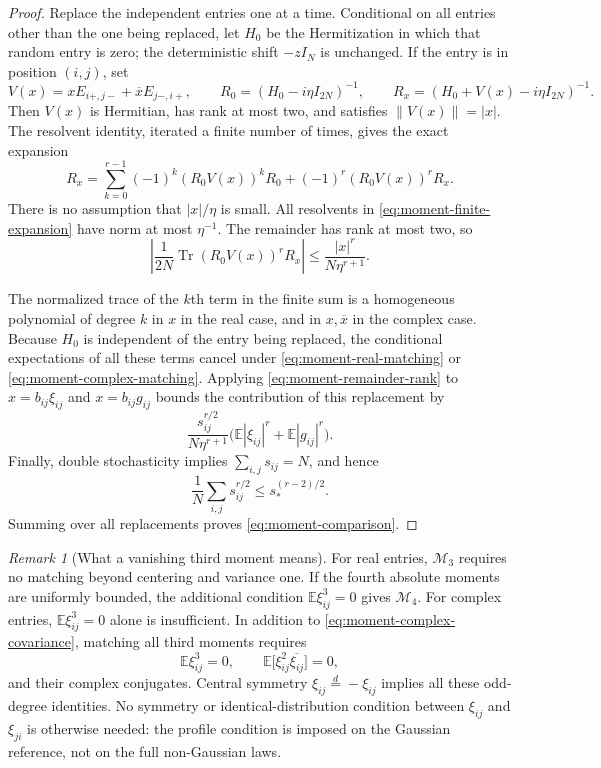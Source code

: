 \documentclass[11pt,reqno]{amsart}
\numberwithin{equation}{section}
\theoremstyle{plain}
\theoremstyle{definition}
\theoremstyle{remark}
\newtheorem{remark}[theorem]{Remark}
\begin{document}
\begin{proof}
Replace the independent entries one at a time.  Conditional on all
entries other than the one being replaced, let $H_0$ be the Hermitization
in which that random entry is zero; the deterministic shift $-zI_N$ is
unchanged.  If the entry is in position $(i,j)$, set
\[
 V(x)=xE_{i+,j-}+\overline xE_{j-,i+},\qquad
 R_0=(H_0-i\eta I_{2N})^{-1},\qquad
 R_x=(H_0+V(x)-i\eta I_{2N})^{-1}.
\]
Then $V(x)$ is Hermitian, has rank at most two, and satisfies
$\|V(x)\|=|x|$.  The resolvent identity, iterated a finite number of
times, gives the exact expansion
\begin{equation}\label{eq:moment-finite-expansion}
 R_x=\sum_{k=0}^{r-1}(-1)^k(R_0V(x))^kR_0
       +(-1)^r(R_0V(x))^rR_x.
\end{equation}
There is no assumption that $|x|/\eta$ is small.  All resolvents in
\eqref{eq:moment-finite-expansion} have norm at most $\eta^{-1}$.
The remainder has rank at most two, so
\begin{equation}\label{eq:moment-remainder-rank}
 \left|\frac1{2N}\operatorname{Tr}(R_0V(x))^rR_x\right|
 \le\frac{|x|^r}{N\eta^{r+1}}.
\end{equation}

The normalized trace of the $k$th term in the finite sum is a homogeneous
polynomial of degree $k$ in $x$ in the real case, and in $x,\overline x$
in the complex case.  Because $H_0$ is independent of the entry being
replaced, the conditional expectations of all these terms cancel under
\eqref{eq:moment-real-matching} or
\eqref{eq:moment-complex-matching}.  Applying
\eqref{eq:moment-remainder-rank} to $x=b_{ij}\xi_{ij}$ and
$x=b_{ij}g_{ij}$ bounds the contribution of this replacement by
\[
 \frac{s_{ij}^{r/2}}{N\eta^{r+1}}
       \bigl(\mathbb E|\xi_{ij}|^r+\mathbb E|g_{ij}|^r\bigr).
\]
Finally, double stochasticity implies $\sum_{i,j}s_{ij}=N$, and hence
\[
 \frac1N\sum_{i,j}s_{ij}^{r/2}
 \le s_*^{(r-2)/2}.
\]
Summing over all replacements proves \eqref{eq:moment-comparison}.
\end{proof}

\begin{remark}[What a vanishing third moment means]\label{rem:complex-third}
For real entries, $\mathcal M_3$ requires no matching beyond centering
and variance one.  If the fourth absolute moments are uniformly bounded,
the additional condition $\mathbb E\xi_{ij}^3=0$ gives $\mathcal M_4$.
For complex entries, $\mathbb E\xi_{ij}^3=0$ alone is insufficient.
In addition to \eqref{eq:moment-complex-covariance}, matching all third
moments requires
\begin{equation}\label{eq:complex-third-matching-explicit}
 \mathbb E\xi_{ij}^3=0,\qquad
 \mathbb E\bigl[\xi_{ij}^2\overline{\xi_{ij}}\bigr]=0,
\end{equation}
and their complex conjugates.  Central symmetry
$\xi_{ij}\stackrel{d}=-\xi_{ij}$ implies all these odd-degree identities.
No symmetry or identical-distribution condition between $\xi_{ij}$ and
$\xi_{ji}$ is otherwise needed: the profile condition is imposed on
the Gaussian reference, not on the full non-Gaussian laws.
\end{remark}
\end{document}
